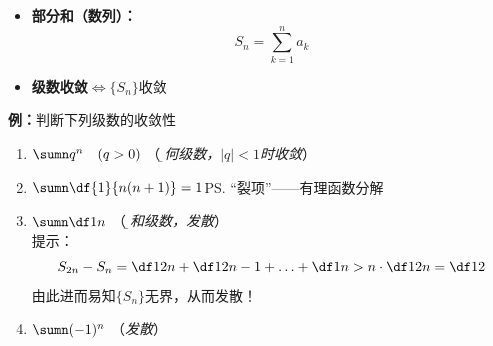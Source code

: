 \begin{itemize}
  \item {\bf 部分和（数列）：}
  $$S_n=\sum\limits_{k=1}^na_k$$
  \item {\bf 级数收敛}$\Leftrightarrow\{S_n\}$收敛
\end{itemize}

{\bf 例：}判断下列级数的收敛性
\begin{enumerate}[(1)]
  \setlength{\itemindent}{1cm}
  \item $\sumn q^n\quad (q>0)$ \quad（{\it\b 几何级数，$|q|<1$时收敛}） 
  \item $\sumn\df{1}{n(n+1)}=1$\quad\ps{“裂项”——有理函数分解}
  \item $\sumn\df 1n$ \quad（{\it\b 调和级数，发散}）\\ 
  提示：$$S_{2n}-S_n=\df1{2n}+\df1{2n-1}+\ldots+\df1n
  >n\cdot\df1{2n}=\df12$$
  由此进而易知$\{S_n\}$无界，从而发散！
  \item $\sumn (-1)^n$ \quad（{\it 发散}）
\end{enumerate}

